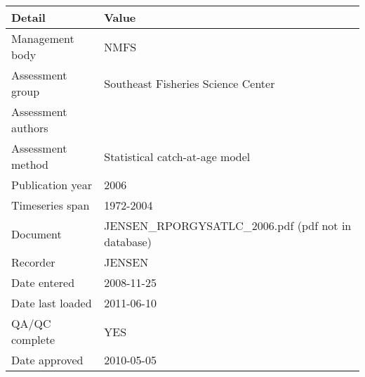 \begin{table}[htb]
\centering
\begin{tabular}{lp{7cm}}
\toprule
Detail & Value \\
\midrule
Management body    & NMFS                                                \\
Assessment group   & Southeast Fisheries Science Center                  \\
Assessment authors &                                                     \\
Assessment method  & Statistical catch-at-age model                      \\
Publication year   & 2006                                                \\
Timeseries span    & 1972-2004                                           \\
Document           & JENSEN\_RPORGYSATLC\_2006.pdf (pdf not in database) \\
Recorder           & JENSEN                                              \\
Date entered       & 2008-11-25                                          \\
Date last loaded   & 2011-06-10                                          \\
QA/QC complete     & YES                                                 \\
Date approved      & 2010-05-05                                          \\
\bottomrule
\end{tabular}
\label{tab:assessdet}
\end{table}
